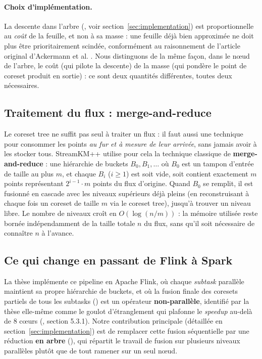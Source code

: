 \paragraph{Choix d'implémentation.}
La descente dans l'arbre (, voir
section~\ref{sec:implementation}) est proportionnelle au \emph{coût} de la
feuille, et non à sa masse : une feuille déjà bien approximée ne doit plus
être prioritairement scindée, conformément au raisonnement de l'article
original d'Ackermann et al. \cite{ackermann2012}. Nous distinguons de la
même façon, dans le nœud de l'arbre, le \og coût\fg{} (qui pilote la
descente) de la \og masse\fg{} (qui pondère le point de coreset produit en
sortie) : ce sont deux quantités différentes, toutes deux nécessaires.

\subsection{Traitement du flux : merge-and-reduce}

Le coreset tree ne suffit pas seul à traiter un flux : il faut aussi une
technique pour consommer les points \emph{au fur et à mesure de leur arrivée},
sans jamais avoir à les stocker tous. StreamKM++ utilise pour cela la
technique classique de \textbf{merge-and-reduce}
\cite{bitsakis2018} : une hiérarchie de \og buckets\fg{} $B_0, B_1, \dots$ où
$B_0$ est un tampon d'entrée de taille au plus $m$, et chaque $B_i$
($i\ge 1$) est soit vide, soit contient exactement $m$ points représentant
$2^{i-1}\cdot m$ points du flux d'origine. Quand $B_0$ se remplit, il est
fusionné en cascade avec les niveaux supérieurs déjà pleins (en reconstruisant
à chaque fois un coreset de taille $m$ via le coreset tree), jusqu'à trouver
un niveau libre. Le nombre de niveaux croît en $O(\log(n/m))$ : la mémoire
utilisée reste bornée indépendamment de la taille totale $n$ du flux, sans
qu'il soit nécessaire de connaître $n$ à l'avance.

\subsection{Ce qui change en passant de Flink à Spark}

La thèse \cite{bitsakis2018} implémente ce pipeline en Apache Flink, où
chaque \emph{subtask} parallèle maintient sa propre hiérarchie de buckets, et
où la fusion finale des coresets partiels de tous les subtasks
() est un opérateur \textbf{non-parallèle},
identifié par la thèse elle-même comme le goulot d'étranglement qui plafonne
le \emph{speedup} au-delà de 8 cœurs (\cite{bitsakis2018}, section 5.3.1).
Notre contribution principale (détaillée en section~\ref{sec:implementation})
est de remplacer cette fusion séquentielle par une réduction \textbf{en
arbre} (), qui répartit le travail de fusion sur
plusieurs niveaux parallèles plutôt que de tout ramener sur un seul nœud.

